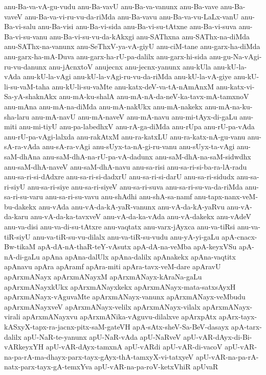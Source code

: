 {anu-Ba-va-vA-gu-vudu
anu-Ba-vavU
anu-Ba-va-vanunx
anu-Ba-vave
anu-Ba-vaveV
anu-Ba-va-vi-ru-vu-da-riMda
anu-Ba-vavu
anu-Ba-va-vu-LaLx-vanU
anu-Ba-vi-salu
anu-Ba-visi
anu-Ba-vi-sida
anu-Ba-vi-su-tAtxne
anu-Ba-vi-suva
anu-Ba-vi-su-vanu
anu-Ba-vi-su-vu-da-kAkxgi
anu-SAThxna
anu-SAThx-na-diMda
anu-SAThx-na-vanunx
anu-SeThxV-ya-vA-giyU
anu-ciM-tane
anu-garx-ha-diMda
anu-garx-ha-mA-Duva
anu-garx-ha-rU-pa-dalilx
anu-garx-hi-sida
anu-gu-Na-vAgi-ru-vu-danunx
anu-jAcnxtoV
anujecnx
anu-jecnx-yanunx
anu-kUla
anu-kU-la-vAda
anu-kU-la-vAgi
anu-kU-la-vAgi-ru-vu-da-riMda
anu-kU-la-vA-giye
anu-kU-li-su-vaM-taha
anu-kU-li-su-vaMte
anu-katx-deV-va-tA-nAmAnxM
anu-katx-vi-Sa-yA-shaknAkx
anu-mA-ku-shalA
anu-mA-nA-da-neV-ka-tavx-mA-tamxnoV
anu-mAna
anu-mA-na-diMda
anu-mA-nakUkx
anu-mA-nakekx
anu-mA-na-ku-sha-laru
anu-mA-navU
anu-mA-naveV
anu-mA-navu
anu-mi-tAyx-di-gaLu
anu-miti
anu-mi-tiyU
anu-pa-labedhxV
anu-rA-ga-diMda
anu-rUpa
anu-rU-pa-vAda
anu-rU-pa-vAgi-lalxda
anu-rakAtxM
anu-ra-katxLU
anu-ra-katx-nA-gu-vanu
anu-sA-ra-vAda
anu-sA-ra-vAgi
anu-sUyx-ta-nA-gi-ru-vanu
anu-sUyx-ta-vAgi
anu-saM-dhAna
anu-saM-dhA-na-rU-pa-vA-dadunx
anu-saM-dhA-na-saM-sidwdhx
anu-saM-dhA-naveV
anu-saM-dhA-navu
anu-sa-risi
anu-sa-ri-si-ba-ra-lA-radu
anu-sa-ri-si-dAdxre
anu-sa-ri-si-dadxrU
anu-sa-ri-si-darU
anu-sa-ri-sidudx
anu-sa-ri-siyU
anu-sa-ri-siye
anu-sa-ri-siyeV
anu-sa-ri-suva
anu-sa-ri-su-va-da-riMda
anu-sa-ri-su-varu
anu-sa-ri-su-vavu
anu-shAdhi
anu-shA-sa-namf
anu-tapx-nanx-veM-bu-dakekx
anu-vAda
anu-vA-da-kA-yaR-vanunx
anu-vA-da-kA-yaRvu
anu-vA-da-karu
anu-vA-da-ka-tavxveV
anu-vA-da-ka-vAda
anu-vA-dakekx
anu-vAdeV
anu-va-disi
anu-va-di-su-tAtxre
anu-vaqtatx
anu-varx-jAyxca
anu-va-tiRsi
anu-va-tiR-siyU
anu-va-tiR-su-vu-dilalx
anu-va-tiR-su-vudu
anu-yA-yi-gaLu
apA-cnacx-Bw-tikaM
apA-dA-nA-thaR-teY-vAsutx
apA-dA-na-veMba
apA-keyxVSu
apA-nA-di-gaLu
apAna
apAna-dalUlx
apAna-dalilx
apAnakekx
apAna-vaqtitx
apAnavu
apAra
apAramf
apAra-miti
apAra-tavx-veM-dare
apAravU
apArxmANayx
apArxmANayxM
apArxmANayx-kAraNa-gaLu
apArxmANayxkUkx
apArxmANayxkekx
apArxmANayx-mata-satxsAyxH
apArxmANayx-vAguvaMte
apArxmANayx-vanunx
apArxmANayx-veMbudu
apArxmANayxveV
apArxmANayx-velilx
apArxmANayx-vilalx
apArxmANayx-virali
apArxmANayxvu
apArxmANika-vAguvu-dilalxve
apArxpAtx
apArx-tayx-kASxyX-tapx-ra-jacnx-pitx-saM-gateVH
apA-sAtx-sheV-Sa-BeV-dasayx
apA-tarx-dalilx
apU-NaR-te-yanunx
apU-NaR-vAda
apU-NaRveV
apU-vAR-dAyx-di-Bi-vARkeyxYH
apU-vAR-dAyx-tamxnA
apU-vARdi
apU-vAR-di-vacoV
apU-vAR-na-pa-rA-ma-dhayx-parx-tayx-gAyx-thA-tamxyX-vi-tatxyeV
apU-vAR-na-pa-rA-natx-parx-tayx-gA-temxYva
apU-vAR-na-pa-roV-ketxVhiR
apUvaR
}
